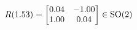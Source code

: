 \documentclass[preview]{standalone}
\begin{document}
\begin{align*}
\special{dvisvgm:raw <g id='unique000'>}R(1.53) = \begin{bmatrix} 0.04 & -1.00 \\ 1.00 & 0.04 \end{bmatrix} \in \text{SO}(2)\special{dvisvgm:raw </g>}
\end{align*}
\end{document}

